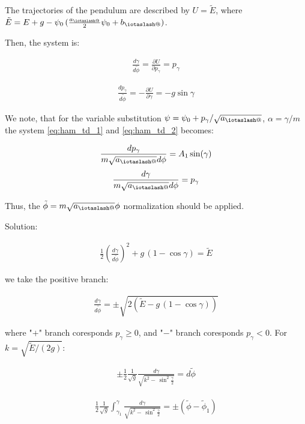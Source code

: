 \documentclass[11pt,a4paper,oneside]{article}
\makeatletter
\newcommand{\iotaslash}{{\mathpalette\iotaslash@\relax}}
\newcommand{\iotaslash@}[2]{
  \raisebox{-0.6\height}[0pt][0pt]{%
    \rotatebox[origin=Bl]{15}{$\m@th#1{\mkern-1mu\mathchar'26}$}%
  }%
  \mkern-9.5mu\nonscript\mkern-1mu
  \iota
  \mkern1mu
}
\makeatother
\begin{document}
The trajectories of the pendulum are described by $U=\tilde{E}$, where $\tilde{E}=E+g-\psi_0\,(\frac{a_\iotaslash}{2}\psi_0+b_\iotaslash)$.

Then, the system is:

\begin{align}
\frac{d \gamma}{d\tilde{\phi}}=\frac{\partial U}{\partial p_\gamma}=p_\gamma
\end{align}

\begin{align}
\frac{d p_\gamma}{d\tilde{\phi}}=-\frac{\partial U}{\partial \gamma}=-g\sin\gamma
\end{align}

We note, that for the variable substitution $\psi=\psi_0+p_\gamma/\sqrt{a_\iotaslash}$, $\alpha=\gamma/m$ the system \eqref{eq:ham_td_1} and \eqref{eq:ham_td_2} becomes:

\begin{align}
\frac{d p_\gamma}{m\sqrt{a_\iotaslash}d\phi}=A_1\sin(\gamma)
\end{align}
\begin{align}
\frac{d \gamma}{m\sqrt{a_\iotaslash}d\phi}= p_\gamma
\end{align}

Thus, the $\tilde{\phi}=m\sqrt{a_\iotaslash}\phi$ normalization should be applied. 

Solution:

\begin{align}
\frac{1}{2}\left(\frac{d \gamma}{d\tilde{\phi}}\right)^2+g\,(1-\cos\gamma)=\tilde{E}
\end{align}

we take the positive branch:

\begin{align}
\frac{d \gamma}{d\tilde{\phi}}=\pm\sqrt{2(\tilde{E}-g\,(1-\cos\gamma))}
\end{align}

where "$+$" branch coresponds $p_\gamma\ge 0$, and "$-$" branch coresponds $p_\gamma<0$. For $k=\sqrt{\tilde{E}/(2g)}$:

\begin{align}
\pm\frac{1}{2}\frac{1}{\sqrt{g}}\frac{d \gamma}{\sqrt{k^2-\,\sin^2\frac{\gamma}{2}}}=d\tilde{\phi}
\end{align}

\begin{align}
\frac{1}{2}\frac{1}{\sqrt{g}}\int_{\gamma_1}^\gamma\frac{d \gamma}{\sqrt{k^2-\,\sin^2\frac{\gamma}{2}}}=\pm(\tilde{\phi}-\tilde{\phi}_1)
\end{align}
\end{document}
